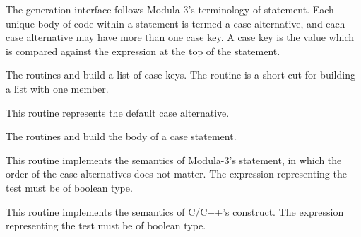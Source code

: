 The generation interface follows Modula-3's terminology of 
statement.  Each unique body of code within a  statement is
termed a case alternative, and each case alternative may have more
than one case key.  A case key is the value which is compared against
the expression at the top of the  statement.

\begin{functionality}
\end{functionality}
\begin{functionality}
The routines  and 
build a list of case keys.  The  routine is a short
cut for building a list with one member.
\end{functionality}


\begin{functionality}
This routine represents the default case alternative.
\end{functionality}

\begin{functionality}
The routines  and 
build the body of a case statement.

\end{functionality}

\begin{functionality}
This routine implements the semantics of Modula-3's 
statement, in which the order of the case alternatives does not matter.
The expression representing the test must be of boolean type.
\end{functionality}

\begin{functionality}
This routine implements the semantics of C/C++'s  construct.
The expression representing the test must be of boolean type.
\end{functionality}

